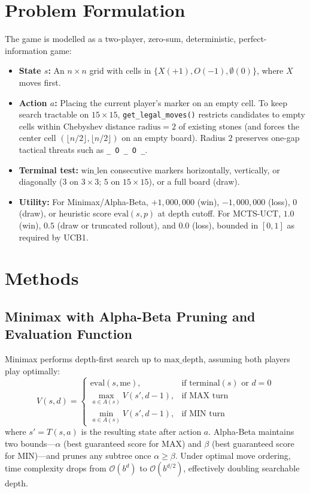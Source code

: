\documentclass[conference]{IEEEtran}
\begin{document}
\section{Problem Formulation}
The game is modelled as a two-player, zero-sum, deterministic, perfect-information game:
\begin{itemize}
    \item \textbf{State $s$:} An $n \times n$ grid with cells in $\{X (+1), O (-1), \emptyset (0)\}$, where $X$ moves first.
    \item \textbf{Action $a$:} Placing the current player's marker on an empty cell. To keep search tractable on $15\times 15$, \texttt{get\_legal\_moves()} restricts candidates to empty cells within Chebyshev distance $\text{radius} = 2$ of existing stones (and forces the center cell $(\lfloor n/2 \rfloor, \lfloor n/2 \rfloor)$ on an empty board). Radius $2$ preserves one-gap tactical threats such as \texttt{\_ O \_ O \_}.
    \item \textbf{Terminal test:} $\text{win\_len}$ consecutive markers horizontally, vertically, or diagonally ($3$ on $3\times 3$; $5$ on $15\times 15$), or a full board (draw).
    \item \textbf{Utility:} For Minimax/Alpha-Beta, $+1{,}000{,}000$ (win), $-1{,}000{,}000$ (loss), $0$ (draw), or heuristic score $\text{eval}(s, p)$ at depth cutoff. For MCTS-UCT, $1.0$ (win), $0.5$ (draw or truncated rollout), and $0.0$ (loss), bounded in $[0, 1]$ as required by UCB1.
\end{itemize}

\section{Methods}

\subsection{Minimax with Alpha-Beta Pruning and Evaluation Function}
Minimax performs depth-first search up to $\text{max\_depth}$, assuming both players play optimally:
\begin{equation}
V(s, d) =
\begin{cases}
\text{eval}(s, \text{me}), & \text{if terminal}(s) \text{ or } d = 0 \\
\max_{a \in A(s)} V(s', d - 1), & \text{if MAX turn} \\
\min_{a \in A(s)} V(s', d - 1), & \text{if MIN turn}
\end{cases}
\end{equation}
where $s' = T(s, a)$ is the resulting state after action $a$.
Alpha-Beta maintains two bounds---$\alpha$ (best guaranteed score for MAX) and $\beta$ (best guaranteed score for MIN)---and prunes any subtree once $\alpha \ge \beta$. Under optimal move ordering, time complexity drops from $\mathcal{O}(b^d)$ to $\mathcal{O}(b^{d/2})$, effectively doubling searchable depth.
\end{document}
